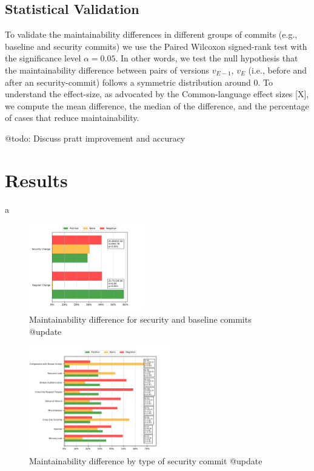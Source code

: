 \documentclass[10pt,conference]{IEEEtran}
\begin{document}
\subsection{Statistical Validation}\label{sec:statsval}

To validate the maintainability differences in different groups of commits (e.g., baseline and security commits) we use the Paired Wilcoxon signed-rank test with the significance level $\alpha = 0.05$. In other words, we test the null hypothesis that the maintainability difference between pairs of versions $v_{E-1}$, $v_E$ (i.e., before and after an security-commit) follows a symmetric distribution around 0. To understand the effect-size, as advocated by the Common-language effect sizes [X], we compute the mean difference, the median of the difference, and the percentage of cases that reduce maintainability.

\textcolor{mypink3}{@todo: Discuss pratt improvement and accuracy}

\section{Results}
a
\begin{figure}[h]
 	\centering
 	\includegraphics[width=0.45\textwidth]{figures/maintainability.pdf}
 	\caption{Maintainability difference for security and baseline commits \textcolor{mypink3}{@update}}
\end{figure}

\begin{figure}[h]
 	\centering
 	\includegraphics[width=0.55\textwidth]{figures/category.pdf}
 	\caption{Maintainability difference by type of security commit \textcolor{mypink3}{@update}}
\end{figure}
\end{document}
